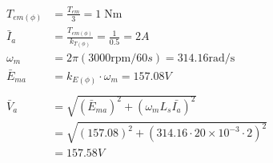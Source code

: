 \documentclass[a4paper,11pt]{article}
\begin{document}
\begin{align*}
    T_{em(\phi)} & = \frac{T_{em}}{3} = 1\;\mathrm{Nm}                            \\
    \bar{I}_a    & = \frac{T_{em(\phi)}}{k_{T(\phi)}} = \frac{1}{0.5} = 2A        \\
    \omega_{m}   & = 2\pi(3000\mathrm{rpm}/60s) = 314.16 \mathrm{rad/s}           \\
    \bar{E}_{ma} & = k_{E(\phi)}{\cdot}\omega_{m} = 157.08V                       \\\\
    \bar{V}_a    & = \sqrt{(\bar{E}_{ma})^2 + (\omega_m  L_s \bar{I_a} )^2}       \\
                 & = \sqrt{(157.08)^{2}+(314.16\cdot20{\times}10^{-3}\cdot2)^{2}} \\
                 & = 157.58V
\end{align*}
\end{document}
